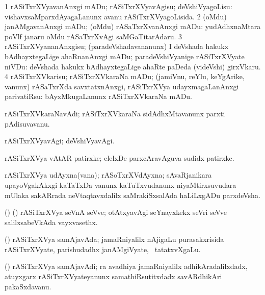 \bentry
{}
\gl{\sakirx}
\bmng
\bnum
\num{1} rASiTxrXVyavanAnxgi mADu; rASiTxrXVyavAgisu; deVshiVyagoLisu:  vishavxsaMparxdAyagaLanunx avanu rASiTxrXVyagoLisida. 
\num{2} (oMdu) janAMgavanAnxgi mADu; (oMdu) rASaTxrXvanAnxgi mADu:  yudAdhxnaMtara poVlf janaru oMdu rASaTxrXvAgi saMGaTitarAdaru. 
\num{3} rASiTxrXVyananAnxgisu; (paradeVshadavananunx) I deVshada hakukx bAdhayxtegaLige ahaRnanAnxgi mADu; paradeVshiVyanige rASiTxrXVyate niVDu:  deVshada hakukx bAdhayxtegaLige ahaRte paDeda (videVshi) girxVkaru. 
\num{4} rASiTxrXVkarisu; rASiTxrXVkaraNa mADu; (jamiVnu, reYlu, keYgArike, \mo vanunx) rASaTxrXda savxtatxnAnxgi, rASiTxrXVya udayxmagaLanAnxgi parivatiRsu:  bAyxMkugaLanunx rASiTxrXVkaraNa mADu. 
\enum
\emng
\eentry

\bentry
{}
\gl{\nA}
\bmng
rASiTxrXVkaraNavAdi; rASiTxrXVkaraNa sidAdhxMtavanunx parxti pAdisuvavanu. 
\emng
\eentry

\bentry
{}
\gl{\kirxvi}
\bmng
rASiTxrXVyavAgi; deVshiVyavAgi. 
\emng
\eentry

\bentry
{}
\gl{\nA}
\bmng
rASiTxrXVya vAtAR patirxke; elelxDe parxcAravAguva sudidx patirxke. 
\emng
\eentry

\bentry
{}
\gl{\nA}
\bmng
rASiTxrXVya udAyxna(vana); rASoTxrXVdAyxna; sAvaRjanikara upayoVgakAkxgi kaTaTxDa \mo vanunx kaTuTxvudanunx niyaMtirxsuvudara mUlaka sakARrada neVtaqtavxdalilx saMrakiSxsalAda haLiLxgADu parxdeVsha. 
\emng
\eentry

\bentry
{}
\gl{\nA}
\bmng
(\birx) (\ca) rASiTxrXVya seVnA seVve; otAtxyavAgi seYnayxkekx seVri seVve salilxsabeVkAda vayxvasethx. 
\emng
\eentry

\bentry
{}
\gl{\nA}
\bmng
(\ca) rASiTxrXVya samAjavAda; jamaRniyalilx nAjigaLu purasakxrisida rASiTxrXVyate, parishudadhx janAMgiVyate, \mo\ tatatxvXgaLu. 
\emng
\eentry

\bentry
{}
\gl{\nA}
\bmng
(\ca) rASiTxrXVya samAjavAdi; ra avadhiya jamaRniyalilx adhikAradalilxdadx, atuyxgarx rASiTxrXVyateyanunx samathiRsutitxdadx savARdhikAri pakaSxdavanu. 
\emng
\eentry

